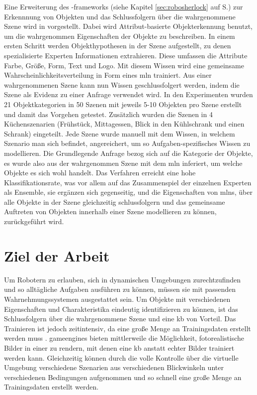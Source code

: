 Eine Erweiterung des \robosherlock-\glspl{framework} (siehe Kapitel \ref{sec:robosherlock} auf S.\pageref{sec:robosherlock}) zur Erkennnung von Objekten und das Schlussfolgern über die wahrgenommene Szene wird in \cite{pr2looking} vorgestellt. Dabei wird Attribut-basierte Objekterkennung benutzt, um die wahrgenommen Eigenschaften der Objekte zu beschreiben. In einem ersten Schritt werden Objekthypothesen in der Szene aufgestellt, zu denen spezialisierte Experten Informationen extrahieren. Diese umfassen die Attribute Farbe, Größe, Form, Text und Logo. Mit diesem Wissen wird eine gemeinsame Wahrscheinlichkeitsverteilung in Form eines \gls{mln} trainiert. Aus einer wahrgenommenen Szene kann nun Wissen geschlussfolgert werden, indem die Szene als Evidenz zu einer Anfrage verwendet wird. In den Experimenten wurden 21 Objektkategorien in 50 Szenen mit jeweils 5-10 Objekten pro Szene erstellt und damit das Vorgehen getestet. Zusätzlich wurden die Szenen in 4 Küchenszenarien (Frühstück, Mittagessen, Blick in den Kühlschrank und einen Schrank) eingeteilt. Jede Szene wurde manuell mit dem Wissen, in welchem Szenario man sich befindet, angereichert, um so Aufgaben-spezifisches Wissen zu modellieren. Die Grundlegende Anfrage bezog sich auf die Kategorie der Objekte, es wurde also aus der wahrgenommen Szene mit dem \gls{mln} inferiert, um welche Objekte es sich wohl handelt. Das Verfahren erreicht eine hohe Klassifikationsrate, was vor allem auf das Zusammenspiel der einzelnen Experten als Ensemble, sie ergänzen sich gegenseitig, und die Eigenschaften von \glspl{mln}, über alle Objekte in der Szene gleichzeitig schlussfolgern und das gemeinsame Auftreten von Objekten innerhalb einer Szene modellieren zu können, zurückgeführt wird.

\section{Ziel der Arbeit}
\label{sec:goal}

Um Robotern zu erlauben, sich in dynamischen Umgebungen zurechtzufinden und so alltägliche Aufgaben ausführen zu können, müssen sie mit passenden Wahrnehmungssystemen ausgestattet sein. Um Objekte mit verschiedenen Eigenschaften und Charakteristika eindeutig identifizieren zu können, ist das Schlussfolgern über die wahrgenommene Szene und eine \gls{kb} von Vorteil. Das Trainieren ist jedoch zeitintensiv, da eine große Menge an Trainingsdaten erstellt werden muss \cite{burger1995}. \glspl{gameengine} bieten mittlerweile die Möglichkeit, fotorealistische Bilder in einer  zu rendern, mit denen eine \gls{kb} anstatt echter Bilder trainiert werden kann. Gleichzeitig können durch die volle Kontrolle über die virtuelle Umgebung verschiedene Szenarien aus verschiedenen Blickwinkeln unter verschiedenen Bedingungen aufgenommen und so schnell eine große Menge an Trainingsdaten erstellt werden. \par 

